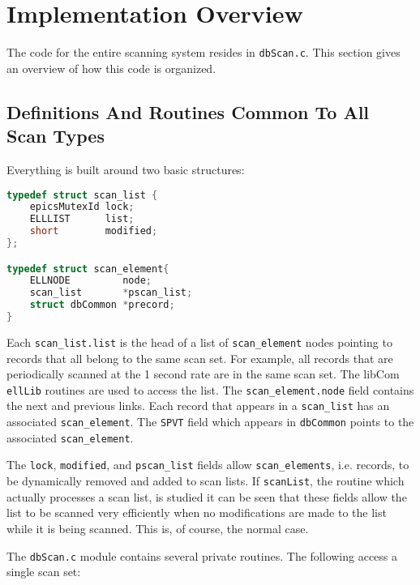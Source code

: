 \section{Implementation Overview}

The code for the entire scanning system resides in \verb|dbScan.c|.
This section gives an overview of how this code is organized.

\subsection{Definitions And Routines Common To All Scan Types}

Everything is built around two basic structures:

\begin{lstlisting}[language=C]
typedef struct scan_list {
    epicsMutexId lock;
    ELLLIST      list;
    short        modified;
};

typedef struct scan_element{
    ELLNODE         node;
    scan_list       *pscan_list;
    struct dbCommon *precord;
}
\end{lstlisting}

Each \verb|scan_list.list| is the head of a list of \verb|scan_element| nodes pointing to records that all belong to the same scan set.
For example, all records that are periodically scanned at the 1 second rate are in the same scan set.
The libCom \verb|ellLib| routines are used to access the list.
The \verb|scan_element.node| field contains the next and previous links.
Each record that appears in a \verb|scan_list| has an associated \verb|scan_element|.
The \verb|SPVT| field which appears in \verb|dbCommon| points to the associated \verb|scan_element|.

The \verb|lock|, \verb|modified|, and \verb|pscan_list| fields allow \verb|scan_elements|, i.e. records, to be dynamically removed and added to scan lists.
If \verb|scanList|, the routine which actually processes a scan list, is studied it can be seen that these fields allow the list to be scanned very efficiently when no modifications are made to the list while it is being scanned.
This is, of course, the normal case.

The \verb|dbScan.c| module contains several private routines.
The following access a single scan set: 

